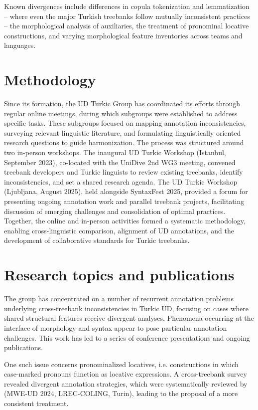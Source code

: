 \documentclass[11pt,a4paper]{article}
\begin{document}
Known divergences include differences in copula tokenization and lemmatization -- where even the major Turkish treebanks follow mutually inconsistent practices -- the morphological analysis of auxiliaries, the treatment of pronominal locative constructions, and varying morphological feature inventories across teams and languages.

\section{Methodology}
Since its formation, the UD Turkic Group has coordinated its efforts through regular online meetings, during which subgroups were established to address specific tasks. These subgroups focused on mapping annotation inconsistencies, surveying relevant linguistic literature, and formulating linguistically oriented research questions to guide harmonization. The process was structured around two in-person workshops. The inaugural UD Turkic Workshop (Istanbul, September 2023), co-located with the UniDive 2nd WG3 meeting, convened treebank developers and Turkic linguists to review existing treebanks, identify inconsistencies, and set a shared research agenda. The UD Turkic Workshop (Ljubljana, August 2025), held alongside SyntaxFest 2025, provided a forum for presenting ongoing annotation work and parallel treebank projects, facilitating discussion of emerging challenges and consolidation of optimal practices. Together, the online and in-person activities formed a systematic methodology, enabling cross-linguistic comparison, alignment of UD annotations, and the development of collaborative standards for Turkic treebanks.

\section{Research topics and publications}
The group has concentrated on a number of recurrent annotation problems underlying cross-treebank inconsistencies in Turkic UD, focusing on cases where shared structural features receive divergent analyses. Phenomena occurring at the interface of morphology and syntax appear to pose particular annotation challenges. This work has led to a series of conference presentations and ongoing publications.

One such issue concerns pronominalized locatives, i.e. constructions in which case-marked pronouns function as locative expressions. A cross-treebank survey revealed divergent annotation strategies, which were systematically reviewed by \citet{washingtonStrategiesAnnotationPronominalised2024} (MWE-UD 2024, LREC-COLING, Turin), leading to the proposal of a more consistent treatment.
\end{document}
